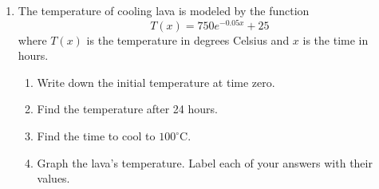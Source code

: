 \documentclass[12pt, twoside]{article}
\begin{document}
\begin{enumerate}
\item The temperature of cooling lava is modeled by the function 
    \[ T(x)=750e^{-0.05x}+25 \] where $T(x)$
    is the temperature in degrees Celsius and $x$ is the time in hours.
    \begin{enumerate}[itemsep=1cm]
        \item Write down the initial temperature at time zero.
        \item Find the temperature after 24 hours.
        \item Find the time to cool to $100^\circ$C.
        \item Graph the lava's temperature. Label each of your answers with their values.
    \end{enumerate}
    \begin{center}
    \end{center}

\end{enumerate}
\end{document}
